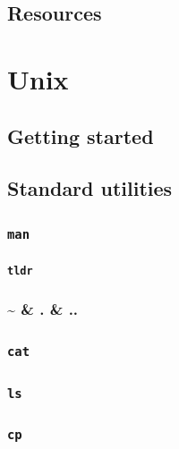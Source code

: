 \documentclass[
]{book}
\begin{document}
\hypertarget{scholar-resources}{%
\section{Resources}\label{scholar-resources}}

\hypertarget{unix}{%
\chapter{Unix}\label{unix}}

\hypertarget{unix-getting-started}{%
\section{Getting started}\label{unix-getting-started}}

\hypertarget{unix-utilities}{%
\section{Standard utilities}\label{unix-utilities}}

\hypertarget{man}{%
\subsection{\texorpdfstring{\texttt{man}}{man}}\label{man}}

\hypertarget{tldr}{%
\subsubsection{\texorpdfstring{\texttt{tldr}}{tldr}}\label{tldr}}

\hypertarget{dots}{%
\subsection{\textasciitilde{} \& . \& ..}\label{dots}}

\hypertarget{cat}{%
\subsection{\texorpdfstring{\texttt{cat}}{cat}}\label{cat}}

\hypertarget{ls}{%
\subsection{\texorpdfstring{\texttt{ls}}{ls}}\label{ls}}

\hypertarget{cp}{%
\subsection{\texorpdfstring{\texttt{cp}}{cp}}\label{cp}}
\end{document}
